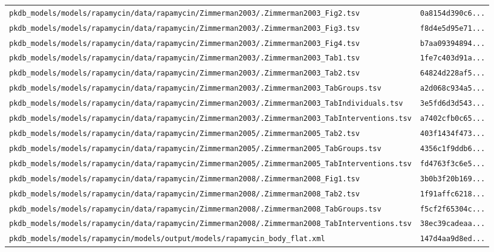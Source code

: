 \documentclass{article}
\begin{document}
\begin{longtable}{ll}
\texttt{pkdb\_models/models/rapamycin/data/rapamycin/Zimmerman2003/.Zimmerman2003\_Fig2.tsv} & \texttt{0a8154d390c6...} \\
\texttt{pkdb\_models/models/rapamycin/data/rapamycin/Zimmerman2003/.Zimmerman2003\_Fig3.tsv} & \texttt{f8d4e5d95e71...} \\
\texttt{pkdb\_models/models/rapamycin/data/rapamycin/Zimmerman2003/.Zimmerman2003\_Fig4.tsv} & \texttt{b7aa09394894...} \\
\texttt{pkdb\_models/models/rapamycin/data/rapamycin/Zimmerman2003/.Zimmerman2003\_Tab1.tsv} & \texttt{1fe7c403d91a...} \\
\texttt{pkdb\_models/models/rapamycin/data/rapamycin/Zimmerman2003/.Zimmerman2003\_Tab2.tsv} & \texttt{64824d228af5...} \\
\texttt{pkdb\_models/models/rapamycin/data/rapamycin/Zimmerman2003/.Zimmerman2003\_TabGroups.tsv} & \texttt{a2d068c934a5...} \\
\texttt{pkdb\_models/models/rapamycin/data/rapamycin/Zimmerman2003/.Zimmerman2003\_TabIndividuals.tsv} & \texttt{3e5fd6d3d543...} \\
\texttt{pkdb\_models/models/rapamycin/data/rapamycin/Zimmerman2003/.Zimmerman2003\_TabInterventions.tsv} & \texttt{a7402cfb0c65...} \\
\texttt{pkdb\_models/models/rapamycin/data/rapamycin/Zimmerman2005/.Zimmerman2005\_Tab2.tsv} & \texttt{403f1434f473...} \\
\texttt{pkdb\_models/models/rapamycin/data/rapamycin/Zimmerman2005/.Zimmerman2005\_TabGroups.tsv} & \texttt{4356c1f9ddb6...} \\
\texttt{pkdb\_models/models/rapamycin/data/rapamycin/Zimmerman2005/.Zimmerman2005\_TabInterventions.tsv} & \texttt{fd4763f3c6e5...} \\
\texttt{pkdb\_models/models/rapamycin/data/rapamycin/Zimmerman2008/.Zimmerman2008\_Fig1.tsv} & \texttt{3b0b3f20b169...} \\
\texttt{pkdb\_models/models/rapamycin/data/rapamycin/Zimmerman2008/.Zimmerman2008\_Tab2.tsv} & \texttt{1f91affc6218...} \\
\texttt{pkdb\_models/models/rapamycin/data/rapamycin/Zimmerman2008/.Zimmerman2008\_TabGroups.tsv} & \texttt{f5cf2f65304c...} \\
\texttt{pkdb\_models/models/rapamycin/data/rapamycin/Zimmerman2008/.Zimmerman2008\_TabInterventions.tsv} & \texttt{38ec39cadeaa...} \\
\texttt{pkdb\_models/models/rapamycin/models/output/models/rapamycin\_body\_flat.xml} & \texttt{147d4aa9d8ed...} \\
\end{longtable}
\end{document}
